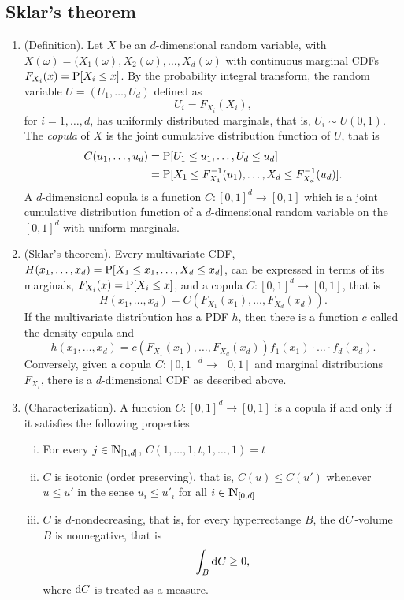 \documentclass[a4paper,10pt]{scrbook}
\begin{document}
\subsection{Sklar's theorem}
\begin{enumerate}
 \item (Definition). Let \(X\) be an \(d\)-dimensional random variable, with 
       \(X(\omega) = (X_1(\omega), X_2(\omega), \ldots, X_d(\omega)\) with continuous marginal CDFs
       \(F_{X_i}(x) = \mathrm{P}[X_i \leq x]\). By the probability integral transform, the random variable 
       \(U=(U_1,\ldots, U_d)\) defined as 
       \[
        U_i = F_{X_i}(X_i), 
       \]
       for \(i=1,\ldots, d\), has uniformly distributed marginals, that is, 
       \(U_i \sim U(0,1)\). The \textit{copula} of \(X\) is the joint cumulative distribution 
       function of \(U\), that is 
       \begin{align*}
        C(u_1, \ldots, u_d) 
	  {}={}& \mathrm{P}[U_1 \leq u_1, \ldots, U_d \leq u_d]
	  \\
	  {}={}& \mathrm{P}[X_1 \leq F_{X_1}^{-1}(u_1), \ldots, X_d \leq F_{X_d}^{-1}(u_d)].
       \end{align*}
       A \(d\)-dimensional copula is a function \(C:[0,1]^d\to[0,1]\)
       which is a joint cumulative distribution function of a \(d\)-dimensional random variable 
       on the \([0,1]^d\) with uniform marginals.
 \item (Sklar's theorem). Every multivariate CDF, \(H(x_1, \ldots, x_d) = \mathrm{P}[X_1\leq x_1, \ldots, X_d \leq x_d]\),
       can be expressed in terms of its marginals, \(F_{X_i}(x) = \mathrm{P}[X_i \leq x]\), and a copula \(C:[0,1]^d\to[0,1]\), 
       that is 
       \[
        H(x_1, \ldots, x_d) = C(F_{X_1}(x_1), \ldots, F_{X_d}(x_d)).
       \]
       If the multivariate distribution has a PDF \(h\), then there is a function \(c\)
       called the density copula and 
       \[
        h(x_1,\ldots, x_d) = c(F_{X_1}(x_1), \ldots, F_{X_d}(x_d)) f_1(x_1)\cdot \ldots \cdot f_d(x_d).
       \]
       Conversely, given a copula \(C:[0,1]^d\to[0,1]\) and marginal distributions 
       \(F_{X_i}\), there is a \(d\)-dimensional CDF as described above.
 \item (Characterization). A function \(C: [0,1]^d\to[0,1]\) is a copula if and 
       only if it satisfies the following properties
       \begin{enumerate}[i.]
        \item For every \(j\in\N_{[1,d]}\), \(C(1,\ldots, 1, t, 1, \ldots, 1) = t\)
        \item \(C\) is isotonic (order preserving), that is, \(C(u) \leq C(u')\) whenever
        \(u \leq u'\) in the sense \(u_i \leq u'_i\) for all \(i\in\N_{[0,d]}\)
        \item \(C\) is \(d\)-nondecreasing, that is, for every hyperrectange \(B\), 
        the \(\mathrm{d} C\)-volume \(B\) is nonnegative, that is
        \[
         \int_{B}\mathrm{d} C \geq 0,
        \]
        where \(\mathrm{d} C\) is treated as a measure.
       \end{enumerate}
       

\end{enumerate}
\end{document}
